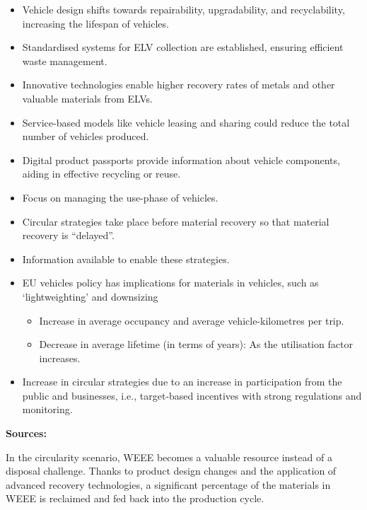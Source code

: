 \begin{itemize}
  \item Vehicle design shifts towards repairability, upgradability, and recyclability, increasing the lifespan of vehicles.
  \item Standardised systems for ELV collection are established, ensuring efficient waste management.
  \item Innovative technologies enable higher recovery rates of metals and other valuable materials from ELVs.
  \item Service-based models like vehicle leasing and sharing could reduce the total number of vehicles produced.
  \item Digital product passports provide information about vehicle components, aiding in effective recycling or reuse.
  \item Focus on managing the use-phase of vehicles.
  \item Circular strategies take place before material recovery so that material recovery is “delayed”.
  \item Information available to enable these strategies.
  \item EU vehicles policy has implications for materials in vehicles, such as `lightweighting' and downsizing
        \begin{itemize}
          \item Increase in average occupancy and average vehicle-kilometres per trip.
          \item Decrease in average lifetime (in terms of years): As the utilisation factor increases.
        \end{itemize}
  \item Increase in circular strategies due to an increase in participation from the public and businesses, i.e., target-based incentives with strong regulations and monitoring.
\end{itemize}



\wasteSubsubsecWEEE 
\textbf{Sources:}~\cite{parajuly2019weee,un2023weee,forti2020weee,eu2012weee, eu2012weeerecast, narbonperpina2020weee}


In the circularity scenario, WEEE becomes a valuable resource instead of a disposal challenge. Thanks to product design changes and the application of advanced recovery technologies, a significant percentage of the materials in WEEE is reclaimed and fed back into the production cycle.

